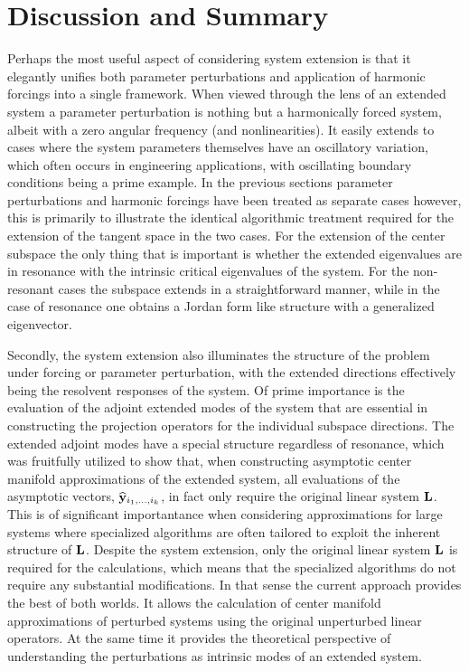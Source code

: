 \section{Discussion and Summary}
\label{sec:discussion}

Perhaps the most useful aspect of considering system extension is that it elegantly unifies both parameter perturbations and application of harmonic forcings into a single framework. When viewed through the lens of an extended system a parameter perturbation is nothing but a harmonically forced system, albeit with a zero angular frequency (and nonlinearities). It easily extends to cases where the system parameters themselves have an oscillatory variation, which often occurs in engineering applications, with oscillating boundary conditions being a prime example. In the previous sections parameter perturbations and harmonic forcings have been treated as separate cases however, this is primarily to illustrate the identical algorithmic treatment required for the extension of the tangent space in the two cases. For the extension of the center subspace the only thing that is important is whether the extended eigenvalues are in resonance with the intrinsic critical eigenvalues of the system. For the non-resonant cases the subspace extends in a straightforward manner, while in the case of resonance one obtains a Jordan form like structure with a generalized eigenvector.

Secondly, the system extension also illuminates the structure of the problem under forcing or parameter perturbation, with the extended directions effectively being the resolvent responses of the system. Of prime importance is the evaluation of the adjoint extended modes of the system that are essential in constructing the projection operators for the individual subspace directions. The extended adjoint modes have a special structure regardless of resonance, which was fruitfully utilized to show that, when constructing asymptotic center manifold approximations of the extended system, all evaluations of the asymptotic vectors, $\widehat{\mathbf{y}}_{i_{1},\ldots,i_{k}}$, in fact only require the original linear system $\mathbf{L}$. This is of significant importantance when considering approximations for large systems where specialized algorithms are often tailored to exploit the inherent structure of $\mathbf{L}$. Despite the system extension, only the original linear system $\mathbf{L}$ is required for the calculations, which means that the specialized algorithms do not require any substantial modifications. In that sense the current approach provides the best of both worlds. It allows the calculation of center manifold approximations of perturbed systems using the original unperturbed linear operators. At the same time it provides the theoretical perspective of understanding the perturbations as intrinsic modes of an extended system. 

